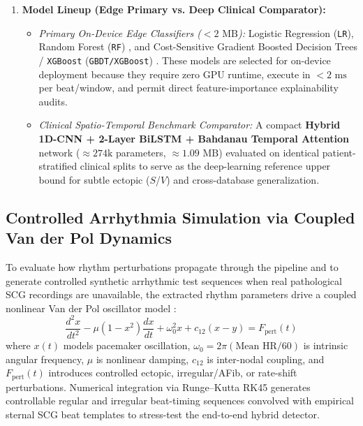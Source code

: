\begin{enumerate}
	\item \textbf{Model Lineup (Edge Primary vs. Deep Clinical Comparator):}
	\begin{itemize}
		\item \textit{Primary On-Device Edge Classifiers ($< 2\text{ MB}$):} Logistic Regression (\texttt{LR}), Random Forest (\texttt{RF}) \cite{breiman2001random}, and Cost-Sensitive Gradient Boosted Decision Trees / \texttt{XGBoost} (\texttt{GBDT/XGBoost}) \cite{chen2016xgboost, pedregosa2011scikit}. These models are selected for on-device deployment because they require zero GPU runtime, execute in $< 2\text{ ms}$ per beat/window, and permit direct feature-importance explainability audits.
		\item \textit{Clinical Spatio-Temporal Benchmark Comparator:} A compact \textbf{Hybrid 1D-CNN + 2-Layer BiLSTM + Bahdanau Temporal Attention} network ($\approx 274\text{k}$ parameters, $\approx 1.09\text{ MB}$) evaluated on identical patient-stratified clinical splits to serve as the deep-learning reference upper bound for subtle ectopic ($S$/$V$) and cross-database generalization.
	\end{itemize}
\end{enumerate}

\subsection{Controlled Arrhythmia Simulation via Coupled Van der Pol Dynamics}
To evaluate how rhythm perturbations propagate through the pipeline and to generate controlled synthetic arrhythmic test sequences when real pathological SCG recordings are unavailable, the extracted rhythm parameters drive a coupled nonlinear Van der Pol oscillator model \cite{vanderpol1928, quiroz2018cardiac}:
\begin{equation}
	\frac{d^2 x}{dt^2} - \mu (1 - x^2)\frac{dx}{dt} + \omega_0^2 x + c_{12}(x - y) = F_{\text{pert}}(t)
\end{equation}
where $x(t)$ models pacemaker oscillation, $\omega_0 = 2\pi(\text{Mean HR}/60)$ is intrinsic angular frequency, $\mu$ is nonlinear damping, $c_{12}$ is inter-nodal coupling, and $F_{\text{pert}}(t)$ introduces controlled ectopic, irregular/AFib, or rate-shift perturbations. Numerical integration via Runge--Kutta RK45 \cite{dormand1980family} generates controllable regular and irregular beat-timing sequences convolved with empirical sternal SCG beat templates to stress-test the end-to-end hybrid detector.

